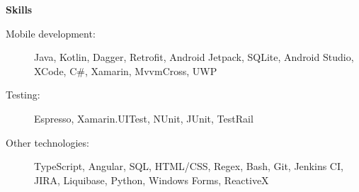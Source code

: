 \documentclass[letterpaper,11pt]{article}
\newcommand{\resheading}[1]{{\large \colorbox{mygrey}{\begin{minipage}{\textwidth}{\textbf{#1 \vphantom{p\^{E}}}}\end{minipage}}}}
\begin{document}
\resheading{Skills}
	\begin{description}
		\item[Mobile development:] { Java, Kotlin, Dagger, Retrofit, Android Jetpack,
			SQLite, Android Studio, XCode, C\#, Xamarin, MvvmCross, UWP
		}
		\item[Testing:] { Espresso, Xamarin.UITest, NUnit, JUnit, TestRail
		}
		\item[Other technologies:] { TypeScript, Angular,  SQL, HTML/CSS, Regex, Bash, 
			Git, Jenkins CI, JIRA, Liquibase, Python, Windows Forms, ReactiveX
		}
	\end{description} %

\end{document}

